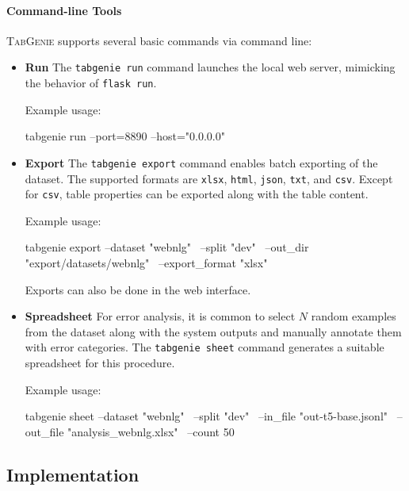 \paragraph{Command-line Tools} \textsc{TabGenie} supports several basic commands via command line:
\begin{itemize}
    \item \textbf{Run} The \texttt{tabgenie run} command launches the local web server, mimicking the behavior of \texttt{flask run}.

          \noindent Example usage:
\begin{bash}
tabgenie run --port=8890 --host="0.0.0.0"
\end{bash}
    \item \textbf{Export} The \texttt{tabgenie export} command enables batch exporting of the dataset. The supported formats are \texttt{xlsx}, \texttt{html}, \texttt{json}, \texttt{txt}, and \texttt{csv}. Except for \texttt{csv}, table properties can be exported along with the table content.

          \noindent Example usage:
\begin{bash}
tabgenie export --dataset "webnlg" \
    --split "dev" \
    --out_dir "export/datasets/webnlg" \
    --export_format "xlsx"
\end{bash}
          \noindent Exports can also be done in the web interface.
    \item \textbf{Spreadsheet} For error analysis, it is common to select $N$ random examples from the dataset along with the system outputs and manually annotate them with error categories. The \texttt{tabgenie sheet} command generates a suitable spreadsheet for this procedure.

          \noindent Example usage:
\begin{bash}
tabgenie sheet --dataset "webnlg" \
    --split "dev" \
    --in_file "out-t5-base.jsonl" \
    --out_file "analysis_webnlg.xlsx" \
    --count 50
    \end{bash}
\end{itemize}


\subsection{Implementation}
\label{sec:tabgenie:architecture}

